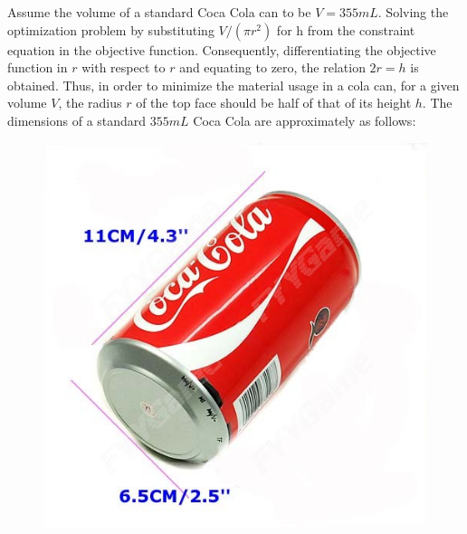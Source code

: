 \documentclass[12pt]{article}
\begin{document}
Assume the volume of a standard Coca Cola can to be $V = 355 mL$. Solving the optimization problem by substituting $V/(\pi r^{2})$ for h from the constraint equation in the objective function. Consequently, differentiating the objective function in $r$ with respect to $r$ and equating to zero, the relation $2r = h$ is obtained. Thus, in order to minimize the material usage in a cola can, for a given volume $V$, the radius $r$ of the top face should be half of that of its height $h$. The dimensions of a standard $355 mL$ Coca Cola are approximately as follows:
\begin{figure}[ht]
\includegraphics[scale=0.3]{img.jpg}
\end{figure}
\end{document}
